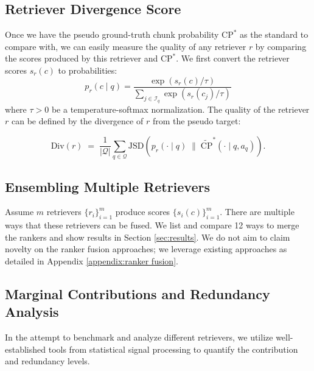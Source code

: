 \documentclass{article}
\theoremstyle{plain}
\theoremstyle{definition}
\theoremstyle{remark}
\begin{document}
\subsection{Retriever Divergence Score }
Once we have the pseudo ground-truth chunk probability \texorpdfstring{$\mathrm{CP}^\ast$}{CP*} as the standard to compare with, we can easily measure the quality of any retriever $r$ by comparing the scores produced by this retriever and \texorpdfstring{$\mathrm{CP}^\ast$}{CP*}. We first convert the retriever scores $s_r(c)$ to probabilities:
\begin{equation}
p_r(c\mid q)=\frac{\exp(s_r(c)/\tau)}{\sum_{j\in\mathcal{I}_q}\exp(s_r(c_j)/\tau)}
\end{equation}
where $\tau>0$ be a temperature-softmax normalization. The quality of the retriever $r$ can be defined by the divergence of $r$ from the pseudo target:
\begin{small}
\begin{equation}
\label{eq:div}
\mathrm{Div}(r)\;=\;\frac{1}{|\mathcal{Q}|}\sum_{q\in\mathcal{Q}}
\mathrm{JSD}\!\left(p_r(\cdot\mid q)\;\Big\|\;\widetilde{\mathrm{CP}}^\ast(\cdot\mid q,a_q)\right).
\end{equation}
\end{small}

\subsection{Ensembling Multiple Retrievers}
Assume $m$ retrievers $\{r_i\}_{i=1}^m$ produce scores $\{s_i(c)\}_{i=1}^m$. There are multiple ways that these retrievers can be fused. We list and compare 12 ways to merge the rankers and show results in Section \ref{sec:results}. We do not aim to claim novelty on the ranker fusion approaches; we leverage existing approaches as detailed in Appendix \ref{appendix:ranker fusion}.

\subsection{Marginal Contributions and Redundancy Analysis}
In the attempt to benchmark and analyze different retrievers, we utilize well-established tools from statistical signal processing to quantify the contribution and redundancy levels.
\end{document}
